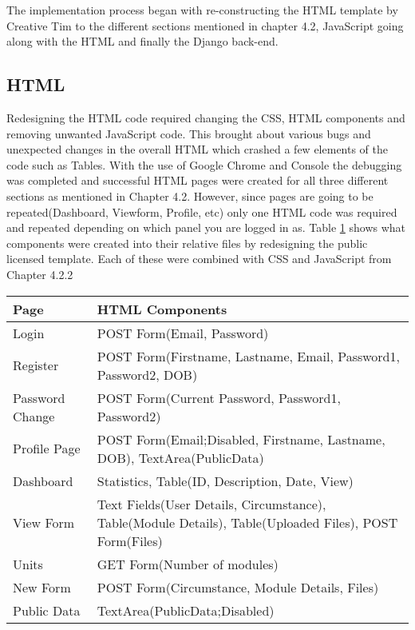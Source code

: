 \documentclass[../main.tex]{subfiles}
\begin{document}
\raggedright
The implementation process began with re-constructing the HTML template by Creative Tim\cite{creativeTimTemplate} to the different sections mentioned in chapter 4.2, JavaScript going along with the HTML and finally the Django back-end.

\subsection{HTML}
Redesigning the HTML code required changing the CSS, HTML components and removing unwanted JavaScript code. This brought about various bugs and unexpected changes in the overall HTML which crashed a few elements of the code such as Tables. With the use of Google Chrome and Console the debugging was completed and successful HTML pages were created for all three different sections as mentioned in Chapter 4.2. However, since pages are going to be repeated(Dashboard, Viewform, Profile, etc) only one HTML code was required and repeated depending on which panel you are logged in as. Table \ref{tab:htmlcom} shows what components were created into their relative files by redesigning the public licensed template. Each of these were combined with CSS and JavaScript from Chapter 4.2.2

\bgroup
\def\arraystretch{2}%
\begin{table}[H]
\centering
\begin{tabular}{|l| p{9cm} |}
\hline
\textbf{Page} & \textbf{HTML Components} \\ \hline
Login & POST Form(Email, Password) \\ \hline
Register & POST Form(Firstname, Lastname, Email, Password1, Password2, DOB) \\ \hline
Password Change & POST Form(Current Password, Password1, Password2) \\ \hline
Profile Page & POST Form(Email;Disabled, Firstname, Lastname, DOB), TextArea(PublicData) \\ \hline
Dashboard & Statistics, Table(ID, Description, Date, View) \\ \hline
View Form & Text Fields(User Details, Circumstance), Table(Module Details), Table(Uploaded Files), POST Form(Files) \\ \hline
Units & GET Form(Number of modules) \\ \hline
New Form & POST Form(Circumstance, Module Details, Files) \\ \hline
Public Data & TextArea(PublicData;Disabled) \\ \hline
\end{tabular}%
\label{tab:htmlcom} 
\end{table}
\egroup
\end{document}

